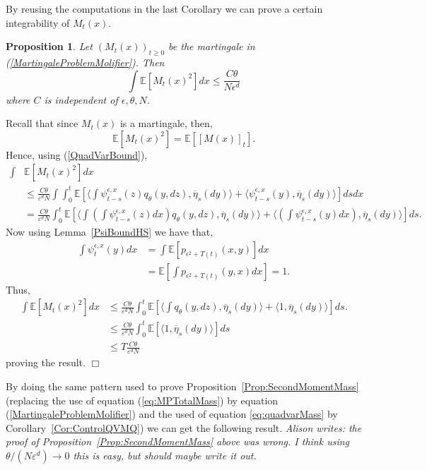 \documentclass[12pt]{article}
\newenvironment {proof}{{\noindent\bf Proof }}{\hfill $\Box$ \medskip}
\newtheorem{proposition}[theorem]{Proposition}
\newcommand{\IE}{\mathbb E}
\newcommand{\comment}[1]{{\color{blue} \it #1}}
\begin{document}
By reusing the computations in the last Corollary we can prove a certain integrability of $M_t(x)$.
\begin{proposition}
Let $(M_t(x))_{t \geq 0}$ be the martingale in (\ref{MartingaleProblemMolifier}). Then
\[ \int \IE\left[ M_t(x)^2 \right] dx \leq \frac{C \theta}{ N \epsilon^{d}} \]
where $C$ is independent of $\epsilon,\theta,N$. \label{IntegrabilityOfM}
\end{proposition}
\begin{proof}
Recall that since $M_t(x)$ is a martingale, then,
\[ \IE\left[ M_t(x)^2 \right] = \IE\left[ [M(x)]_t \right].  \]
Hence, using (\ref{QuadVarBound}),
\begin{align*}
\int &\IE\left[ M_t(x)^2 \right] dx \\ & \leq \frac{C \theta}{\varepsilon^d N} \int \int_0^t \IE\left[ \langle \int \psi_{t-s}^{\epsilon,x}(z) q_\theta(y,dz), \overline{\eta}_s(dy) \rangle + \langle \psi_{t-s}^{\epsilon,x}(y), \overline{\eta}_s(dy)\rangle \right] ds  dx \\ &=  \frac{C \theta}{\varepsilon^d N}  \int_0^t \IE \left[  \langle \int \left( \int \psi_{t-s}^{\epsilon,x}(z) dx \right) q_\theta(y,dz), \overline{\eta}_s(dy) \rangle + \langle \left( \int  \psi_{t-s}^{\epsilon,x}(y) dx \right), \overline{\eta}_s(dy)\rangle \right] ds.
\end{align*}
Now using Lemma~\ref{PsiBoundHS} we have that,
\begin{align*}
\int \psi_t^{\epsilon, x}(y) dx & = \int \IE[p_{\epsilon^2+T(t)}(x,y)] dx \\ &= \IE[ \int p_{\epsilon^2+T(t)}(y,x) dx ] = 1.
\end{align*}
Thus,
\begin{align*}
\int \IE\left[ M_t(x)^2 \right] dx & \leq  \frac{C \theta}{\varepsilon^d N}  \int_0^t \IE \left[  \langle \int  q_\theta(y,dz), \overline{\eta}_s(dy) \rangle + \langle 1, \overline{\eta}_s(dy)\rangle \right] ds. \\ & \leq \frac{C \theta}{\varepsilon^d N} \int_0^t \IE[ \langle 1, \overline{\eta}_s(dy) \rangle ] ds \\ & \leq T \frac{C \theta}{ \varepsilon^d N}
\end{align*}
proving the result.
\end{proof}

By doing the same pattern used to prove Proposition~\ref{Prop:SecondMomentMass} (replacing the use of equation (\ref{eq:MPTotalMass}) by equation (\ref{MartingaleProblemMolifier}) and the used of equation \ref{eq:quadvarMass} by Corollary~\ref{Cor:ControlQVMQ}) we can get the following result.
\comment{Alison writes: the proof of Proposition~\ref{Prop:SecondMomentMass} above was wrong.
I think using $\theta/(N \varepsilon^d) \to 0$ this is easy, but should maybe write it out.}
\end{document}
